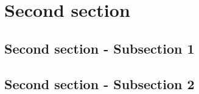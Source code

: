 \section{Second section} \label{sec2:title}
\lipsum[1]

\subsection{Second section - Subsection 1}
\lipsum[1-2]

\subsection{Second section - Subsection 2}
\lipsum[1]
